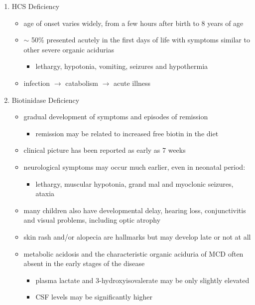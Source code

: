 \documentclass{scrartcl}
\begin{document}
\begin{enumerate}
\item HCS Deficiency
\label{sec:orgcc75ad5}
\begin{itemize}
\item age of onset varies widely, from a few hours after birth to 8 years
of age
\item \(\sim\) 50\% presented acutely in the first days of life with symptoms
similar to other severe organic acidurias
\begin{itemize}
\item lethargy, hypotonia, vomiting, seizures and hypothermia
\end{itemize}
\item infection \(\to\) catabolism \(\to\) acute illness
\end{itemize}

\item Biotinidase Deficiency
\label{sec:org653d0c5}
\begin{itemize}
\item gradual development of symptoms and episodes of remission
\begin{itemize}
\item remission may be related to increased free biotin in the diet
\end{itemize}
\item clinical picture has been reported as early as 7 weeks
\item neurological symptoms may occur much earlier, even in neonatal period:
\begin{itemize}
\item lethargy, muscular hypotonia, grand mal and myoclonic seizures, ataxia
\end{itemize}
\item many children also have developmental delay, hearing loss,
conjunctivitis and visual problems, including optic atrophy
\item skin rash and/or alopecia are hallmarks but may develop late or not
at all
\item metabolic acidosis and the characteristic organic aciduria of MCD
often absent in the early stages of the disease
\begin{itemize}
\item plasma lactate and 3-hydroxyisovalerate may be only slightly
elevated
\item CSF levels may be significantly higher
\end{itemize}
\end{itemize}
\end{enumerate}
\end{document}
